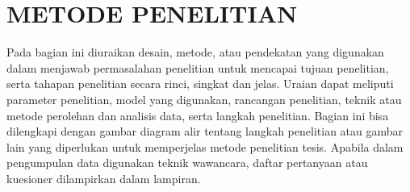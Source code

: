 \chapter{METODE PENELITIAN}

Pada bagian ini diuraikan desain, metode, atau pendekatan yang digunakan dalam menjawab permasalahan penelitian untuk mencapai tujuan penelitian, serta tahapan penelitian secara rinci, singkat dan jelas. Uraian dapat meliputi parameter penelitian, model yang digunakan, rancangan penelitian, teknik atau metode perolehan dan analisis data, serta langkah penelitian. Bagian ini bisa dilengkapi dengan gambar diagram alir tentang langkah penelitian atau gambar lain yang diperlukan untuk memperjelas metode penelitian tesis. Apabila dalam pengumpulan data digunakan teknik wawancara, daftar pertanyaan atau kuesioner dilampirkan dalam lampiran.